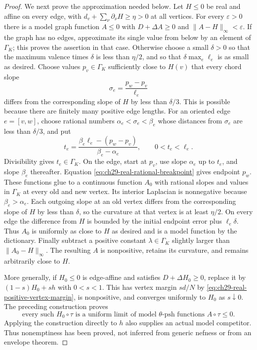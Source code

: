 \begin{proof}
We next prove the approximation needed below.  Let $H\leq0$ be real
and affine on every edge, with
$d_v+\sum_\nu\partial_\nu H\geq\eta>0$ at all vertices.  For every
$\varepsilon>0$ there is a model graph function $A\leq0$ with
$D+\Delta A\geq0$ and $\|A-H\|_\infty<\varepsilon$.
If the graph has no edges, approximate its single value from below by
an element of $\Gamma_K$; this proves the assertion in that case.
Otherwise choose a small $\delta>0$ so that the maximum valence times
$\delta$ is less than $\eta/2$, and so that
$\delta\max_e\ell_e$ is as small as desired.  Choose values
$p_v\in\Gamma_K$ sufficiently close to $H(v)$ that every chord slope
\[
 \sigma_e=\frac{p_w-p_v}{\ell_e}
\]
differs from the corresponding slope of $H$ by less than $\delta/3$.
This is possible because there are finitely many positive edge lengths.
For an oriented edge $e=[v,w]$, choose rational numbers
$\alpha_e<\sigma_e<\beta_e$ whose distances from $\sigma_e$ are less
than $\delta/3$, and put
\begin{equation}
\label{eq:ch29-real-rational-breakpoint}
 t_e=\frac{\beta_e\ell_e-(p_w-p_v)}{\beta_e-\alpha_e},
 \qquad 0<t_e<\ell_e.
\end{equation}
Divisibility gives $t_e\in\Gamma_K$.  On the edge, start at $p_v$,
use slope $\alpha_e$ up to $t_e$, and slope $\beta_e$ thereafter.
Equation \eqref{eq:ch29-real-rational-breakpoint} gives endpoint $p_w$.
These functions glue to a continuous function $A_0$ with rational slopes
and values in $\Gamma_K$ at every old and new vertex.  Its interior
Laplacian is nonnegative because $\beta_e>\alpha_e$.  Each outgoing
slope at an old vertex differs from the corresponding slope of $H$ by
less than $\delta$, so the curvature at that vertex is at least
$\eta/2$.  On every edge the difference from $H$ is bounded by the
initial endpoint error plus $\ell_e\delta$.  Thus $A_0$ is uniformly
as close to $H$ as desired and is a model function by the dictionary.
Finally subtract a positive constant $\lambda\in\Gamma_K$ slightly
larger than $\|A_0-H\|_\infty$.  The resulting $A$ is nonpositive,
retains its curvature, and remains arbitrarily close to $H$.

More generally, if $H_0\leq0$ is edge-affine and satisfies
$D+\Delta H_0\geq0$, replace it by
$(1-s)H_0+sh$ with $0<s<1$.  This has vertex margin $sd/N$ by
\eqref{eq:ch29-real-positive-vertex-margin}, is nonpositive, and converges
uniformly to $H_0$ as $s\downarrow0$.  The preceding construction proves
\begin{equation}
\label{eq:ch29-real-real-chord-approximation}
 \text{every such }H_0\circ\tau\text{ is a uniform limit of
 model }\theta\text{-psh functions }A\circ\tau\leq0.
\end{equation}
Applying the construction directly to $h$ also supplies an actual model
competitor.  Thus nonemptiness has been proved, not inferred from generic
nefness or from an envelope theorem.


\end{proof}
